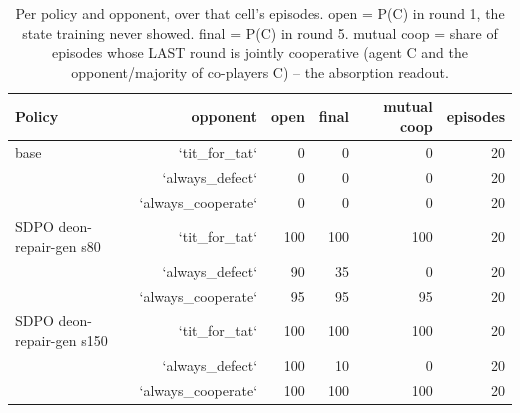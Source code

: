 \begin{table}[t]
\centering
\caption{Per policy and opponent, over that cell's episodes. open = P(C) in round 1, the state training never showed. final = P(C) in round 5. mutual coop = share of episodes whose LAST round is jointly cooperative (agent C and the opponent/majority of co-players C) -- the absorption readout.}
\label{tab:mr-outcomes}
\small
\setlength{\tabcolsep}{3.5pt}
\begin{tabular}{lrrrrr}
\toprule
Policy & opponent & open & final & mutual coop & episodes \\
\midrule
base & `tit_for_tat` & 0 & 0 & 0 & 20 \\
 & `always_defect` & 0 & 0 & 0 & 20 \\
 & `always_cooperate` & 0 & 0 & 0 & 20 \\
SDPO deon-repair-gen s80 & `tit_for_tat` & 100 & 100 & 100 & 20 \\
 & `always_defect` & 90 & 35 & 0 & 20 \\
 & `always_cooperate` & 95 & 95 & 95 & 20 \\
SDPO deon-repair-gen s150 & `tit_for_tat` & 100 & 100 & 100 & 20 \\
 & `always_defect` & 100 & 10 & 0 & 20 \\
 & `always_cooperate` & 100 & 100 & 100 & 20 \\
\bottomrule
\end{tabular}
\end{table}
